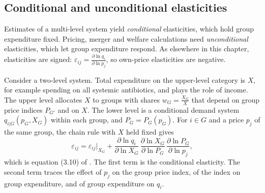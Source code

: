 \subsection{Conditional and unconditional elasticities}\label{sec:05-uncond}

Estimates of a multi-level system yield \emph{conditional} elasticities, which hold group expenditure
fixed. Pricing, merger and welfare calculations need \emph{unconditional} elasticities, which let group
expenditure respond. As elsewhere in this chapter, elasticities are signed: $\varepsilon_{ij} =
\frac{\partial\ln q_i}{\partial\ln p_j}$, so own-price elasticities are negative.

Consider a two-level system. Total expenditure on the upper-level category is $X$, for example spending
on all systemic antibiotics, and plays the role of income. The upper level allocates $X$ to groups with
shares $w_G = \frac{X_G}{X}$ that depend on group price indices $P_{G'}$ and on $X$. The lower level is a
conditional demand system $q_{i|G}(p_G, X_G)$ within each group, and $P_G = P_G(p_G)$. For $i \in G$ and
a price $p_j$ of the same group, the chain rule with $X$ held fixed gives
\begin{equation}\label{eq:05-uncond-elast}
  \varepsilon_{ij} = \varepsilon_{ij}\big|_{X_G}
  + \frac{\partial\ln q_i}{\partial\ln X_G}\,\frac{\partial\ln X_G}{\partial\ln P_G}\,
    \frac{\partial\ln P_G}{\partial\ln p_j},
\end{equation}
which is equation (3.10) of \citet{ChaudhuriGoldbergJia2006}. The first term is the conditional
elasticity. The second term traces the effect of $p_j$ on the group price index, of the index on group
expenditure, and of group expenditure on $q_i$.

